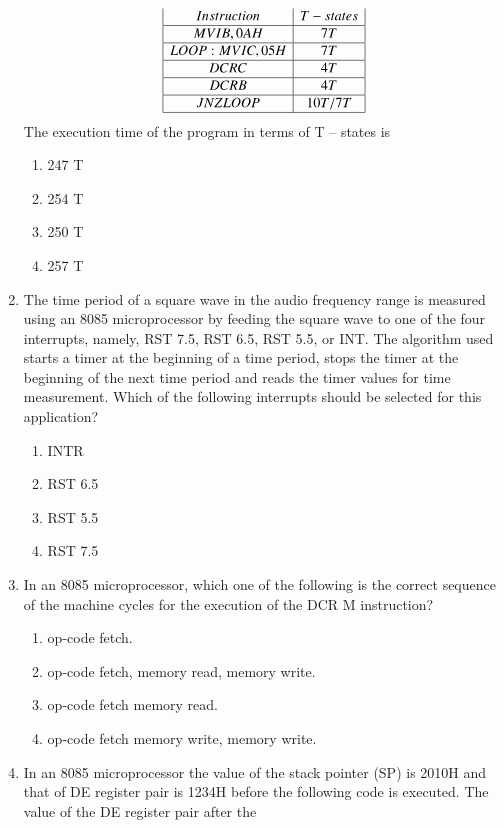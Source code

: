 \documentclass[journal,12pt,twocolumn]{IEEEtran}
\begin{document}
\begin{enumerate}
\begin{displaymath}
\begin{array}{|c|c|}
 Instruction  & T-states   \\\hline
 MVI B, 0AH & 7T           \\\hline
 LOOP: MVIC, 05H & 7T      \\\hline
 DCR C & 4T                \\\hline
 DCR B & 4T                \\\hline
 JNZ LOOP & 10T/7T         \\\hline
\end{array}
\end{displaymath}
The execution time of the program in terms of T – states is

 \begin{enumerate}
      \item 247 T
      \item 254 T
      \item 250 T
      \item 257 T
    \end{enumerate}
    \item The time period of a square wave in the audio frequency range is measured using an 8085
microprocessor by feeding the square wave to one of the four interrupts, namely, RST 7.5, RST
6.5, RST 5.5, or INT. The algorithm used starts a timer at the beginning of a time period, stops
the timer at the beginning of the next time period and reads the timer values for time
measurement. Which of the following interrupts should be selected for this application?
     \begin{enumerate}
      \item INTR
      \item RST 6.5
      \item RST 5.5
      \item RST 7.5
    \end{enumerate}
    \item In an 8085 microprocessor, which one of the following is the correct sequence of the machine
cycles for the execution of the DCR M instruction? 
 \begin{enumerate}
      \item op-code fetch. 
      \item op-code fetch, memory read, memory write.
      \item op-code fetch memory read.
      \item op-code fetch memory write, memory write.
    \end{enumerate} 
    \item In an 8085 microprocessor the value of the stack pointer (SP) is 2010H and that of DE register pair is 1234H before the following code is executed. The value of the DE register pair after the

\end{enumerate}
\end{document}
